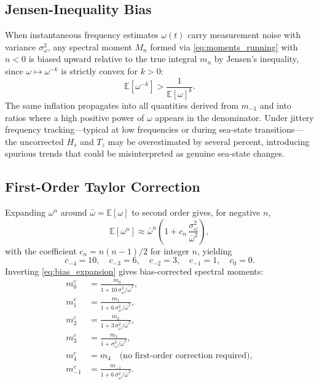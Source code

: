 \documentclass[journal]{IEEEtran}
\begin{document}
    \subsection{Jensen-Inequality Bias}

    When instantaneous frequency estimates $\omega(t)$ carry measurement
    noise with variance $\sigma_\omega^2$, any spectral moment $M_n$ formed
    via \eqref{eq:moments_running} with $n < 0$ is biased upward relative
    to the true integral $m_n$ by Jensen's inequality, since
    $\omega \mapsto \omega^{-k}$ is strictly convex for $k > 0$:
    \begin{equation}
        \mathbb{E}\!\left[\omega^{-k}\right]
        > \frac{1}{\mathbb{E}[\omega]^k}.
    \end{equation}
    The same inflation propagates into all quantities derived from
    $m_{-1}$ and into ratios where a high positive power of $\omega$
    appears in the denominator.
    Under jittery frequency tracking---typical at low frequencies or
    during sea-state transitions---the uncorrected $H_s$ and $T_z$ may
    be overestimated by several percent, introducing spurious trends
    that could be misinterpreted as genuine sea-state changes.

    \subsection{First-Order Taylor Correction}

    Expanding $\omega^n$ around $\bar\omega = \mathbb{E}[\omega]$ to second
    order gives, for negative $n$,
    \begin{equation}
        \mathbb{E}\!\left[\omega^n\right] \approx
        \bar\omega^n
        \!\left(1 + c_n\,\frac{\sigma_\omega^2}{\bar\omega^2}\right),
        \label{eq:bias_expansion}
    \end{equation}
    with the coefficient $c_n = n(n-1)/2$ for integer $n$, yielding
    \begin{equation}
        c_{-4}=10,\quad c_{-3}=6,\quad c_{-2}=3,\quad c_{-1}=1,
        \quad c_0=0.
    \end{equation}
    Inverting \eqref{eq:bias_expansion} gives bias-corrected spectral moments:
    \begin{align}
        m_0^c &= \frac{m_0}{1 + 10\,\sigma_\omega^2/\bar\omega^2},
        \label{eq:M0c}\\
        m_1^c &= \frac{m_1}{1 + 6\,\sigma_\omega^2/\bar\omega^2},
        \label{eq:M1c}\\
        m_2^c &= \frac{m_2}{1 + 3\,\sigma_\omega^2/\bar\omega^2},
        \label{eq:M2c}\\
        m_3^c &= \frac{m_3}{1 + \sigma_\omega^2/\bar\omega^2},
        \label{eq:M3c}\\
        m_4^c &= m_4
        \quad\text{(no first-order correction required)},
        \label{eq:M4c}\\
        m_{-1}^c &= \frac{m_{-1}}{1 + 6\,\sigma_\omega^2/\bar\omega^2}.
        \label{eq:Mm1c}
    \end{align}
\end{document}
